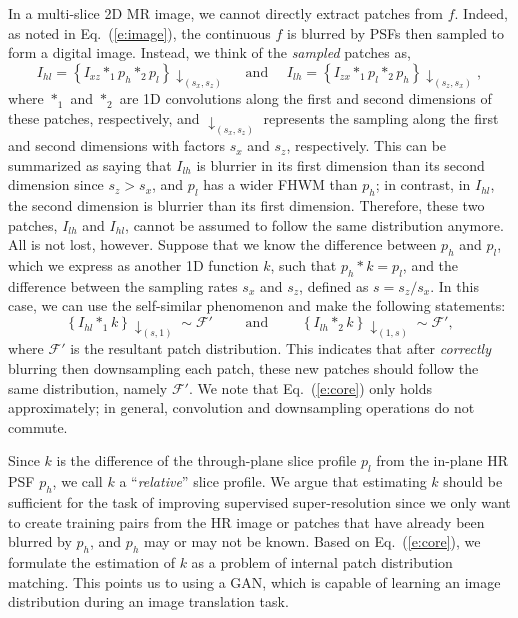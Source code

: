 \documentclass[runningheads]{llncs}
\begin{document}
In a multi-slice 2D MR image, we cannot directly extract
patches from $f$. Indeed, as noted in Eq.~(\ref{e:image}), the
continuous $f$ is blurred by PSFs then sampled to form a
digital image. Instead, we think of the \textit{sampled} patches as,
%
\begin{equation}
%
I_{hl} = \left\{I_{xz} \ast_1 p_h \ast_2 p_l\right\} \downarrow_{(s_x,
s_z)}
%
\quad \mbox{ and } \quad
%
I_{lh} = \left\{I_{zx} \ast_1 p_l \ast_2 p_h\right\} \downarrow_{(s_z,
s_x)},
%
\end{equation}
%
where $\ast_1$ and $\ast_2$ are 1D convolutions along the first and
second dimensions of these patches, respectively, and
$\downarrow_{(s_x, s_z)}$ represents the sampling along the first and
second dimensions with factors $s_x$ and $s_z$, respectively. This can
be summarized as saying that $I_{lh}$ is blurrier in its first
dimension than its second dimension since $s_z > s_x$, and $p_l$ has
a wider FHWM than $p_h$; in contrast, in $I_{hl}$, the second dimension is
blurrier than its first dimension. Therefore, these two patches,
$I_{lh}$ and $I_{hl}$, cannot be assumed to follow the same
distribution anymore. All is not lost, however. Suppose that we know the
difference between $p_h$ and $p_l$, which we express as another 1D
function $k$, such that $p_h \ast k = p_l$, and the difference between
the sampling rates $s_x$ and $s_z$, defined as $s = s_z / s_x$. In
this case, we can use the self-similar phenomenon and make the
following statements:
%
\begin{equation}
%
\left\{I_{hl} \ast_1 k \right\}\downarrow_{(s, 1)} \sim \mathcal{F'}
%
\qquad \mbox{ and } \qquad
%
\left\{I_{lh} \ast_2 k \right\}\downarrow_{(1, s)} \sim \mathcal{F'},
%
\label{e:core}
%
\end{equation}
%
where $\mathcal{F'}$ is the resultant patch distribution. This
indicates that after \textit{correctly} blurring then downsampling
each patch, these new patches should follow the same distribution,
namely $\mathcal{F'}$. We note that Eq.~(\ref{e:core}) only holds
approximately; in general, convolution and downsampling
operations do not commute.

Since $k$ is the difference of the through-plane slice profile $p_l$
from the in-plane HR PSF $p_h$, we call $k$ a
``\textit{relative}'' slice profile. We argue that estimating $k$
should be sufficient for the task of improving supervised
super-resolution since we only want to create training pairs from the HR
image or patches that have already been blurred by $p_h$, and $p_h$
may or may not be known. Based on Eq.~(\ref{e:core}), we formulate the
estimation of $k$ as a problem of internal patch distribution
matching. This points us to using a GAN, which is capable of
learning an image distribution during an image translation task.
\end{document}
